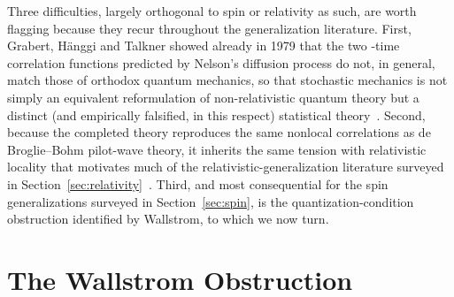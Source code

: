 \documentclass[11pt]{article}
\begin{document}
Three difficulties, largely orthogonal to spin or relativity as such, are
worth flagging because they recur throughout the generalization literature.
First, Grabert, H\"anggi and Talkner showed already in 1979 that the two
-time correlation functions predicted by Nelson's diffusion process do not,
in general, match those of orthodox quantum mechanics, so that stochastic
mechanics is not simply an equivalent reformulation of non-relativistic
quantum theory but a distinct (and empirically falsified, in this respect)
statistical theory~\cite{grabert79}. Second, because the completed theory
reproduces the same nonlocal correlations as de Broglie--Bohm pilot-wave
theory, it inherits the same tension with relativistic locality that
motivates much of the relativistic-generalization literature surveyed in
Section~\ref{sec:relativity}~\cite{derakhshanibacciagaluppi22}. Third, and
most consequential for the spin generalizations surveyed in
Section~\ref{sec:spin}, is the quantization-condition obstruction
identified by Wallstrom, to which we now turn.

\section{The Wallstrom Obstruction}\label{sec:wallstrom}
\end{document}
